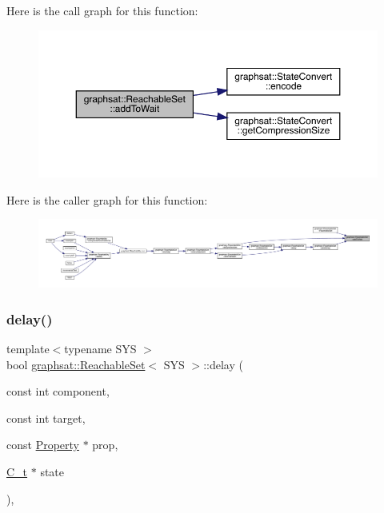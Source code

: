 Here is the call graph for this function\+:
\nopagebreak
\begin{figure}[H]
\begin{center}
\leavevmode
\includegraphics[width=350pt]{classgraphsat_1_1_reachable_set_abcc03556aa2864cdc4b2c1e709b96111_cgraph}
\end{center}
\end{figure}
Here is the caller graph for this function\+:
\nopagebreak
\begin{figure}[H]
\begin{center}
\leavevmode
\includegraphics[width=350pt]{classgraphsat_1_1_reachable_set_abcc03556aa2864cdc4b2c1e709b96111_icgraph}
\end{center}
\end{figure}
\mbox{\label{classgraphsat_1_1_reachable_set_a51f36ef46b73abadf53cd04975924448}} 
\subsubsection{\texorpdfstring{delay()}{delay()}}
{\footnotesize\ttfamily template$<$typename S\+YS $>$ \\
bool \mbox{\hyperlink{classgraphsat_1_1_reachable_set}{graphsat\+::\+Reachable\+Set}}$<$ S\+YS $>$\+::delay (\begin{DoxyParamCaption}\item[{const int}]{component,  }\item[{const int}]{target,  }\item[{const \mbox{\hyperlink{classgraphsat_1_1_property}{Property}} $\ast$}]{prop,  }\item[{\mbox{\hyperlink{classgraphsat_1_1_reachable_set_a0b7981a216ec4c46be913e08d5f0cd07}{C\+\_\+t}} $\ast$}]{state }\end{DoxyParamCaption})\hspace{0.3cm}{\ttfamily [inline]}, {\ttfamily [private]}}

